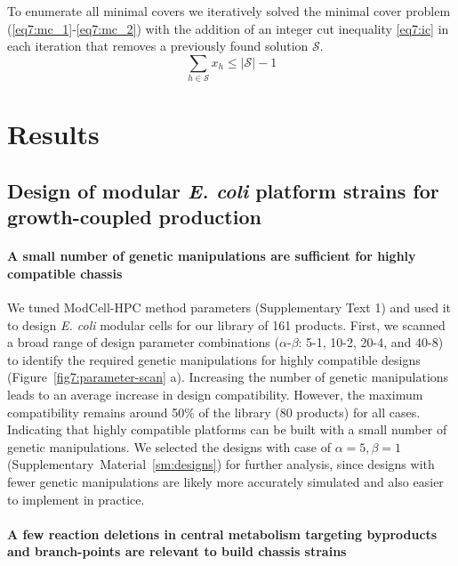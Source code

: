 {To enumerate all minimal covers we iteratively solved the minimal cover problem (\ref{eq7:mc_1}-\ref{eq7:mc_2}) with the addition of an integer cut inequality \eqref{eq7:ic} in each iteration that removes a previously found solution $\mathcal{S}$.
\begin{equation}
    \sum_{h\in\mathcal{S}} x_h \le |\mathcal{S}|  - 1 \label{eq7:ic}
\end{equation}


\section{Results}

\subsection{Design of modular \textit{E. coli} platform strains for growth-coupled production}

\paragraph{A small number of genetic manipulations are sufficient for highly compatible chassis}
We tuned ModCell-HPC method parameters (Supplementary Text 1) and used it to design \textit{E. coli} modular cells for our library of 161 products.
First, we scanned a broad range of design parameter combinations ($\alpha$-$\beta$: 5-1, 10-2, 20-4, and 40-8) to identify the required genetic manipulations for highly compatible designs (Figure~\ref{fig7:parameter-scan} a).
Increasing the number of genetic manipulations leads to an average increase in design compatibility.
However, the maximum compatibility remains around 50\% of the library (80 products) for all cases.
Indicating that highly compatible platforms can be built with a small number of genetic manipulations.
We selected the designs with case of $\alpha=5,\beta=1$ (Supplementary~Material~\ref{sm:designs}) for further analysis, since designs with fewer genetic manipulations are likely more accurately simulated and also easier to implement in practice.

\paragraph{A few reaction deletions in central metabolism targeting byproducts and branch-points are relevant to build chassis strains}

}
